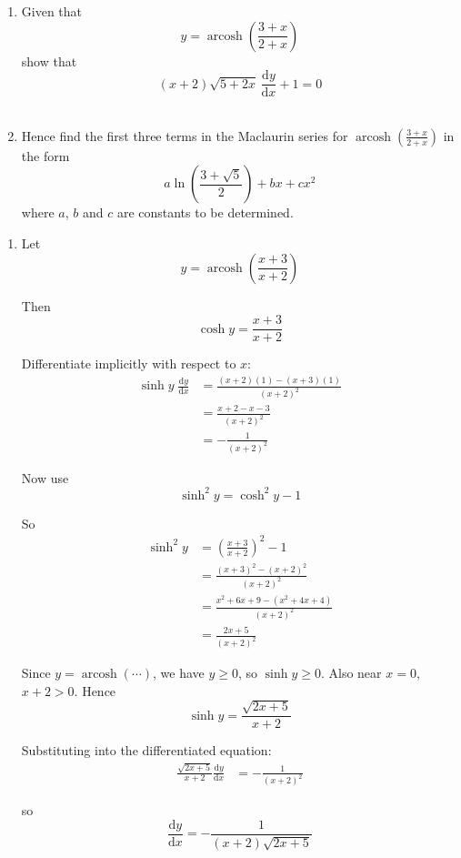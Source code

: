 \documentclass[leqno]{article}
\begin{document}
\begin{enumerate}[
  label=\textbf{\arabic*.},
  leftmargin=*,
  topsep=0pt,
  partopsep=0pt,
  parsep=0pt
]
\begin{enumerate}[label=\textbf{(\alph*)}]
  \item Given that \[y=\operatorname{arcosh}\left(\frac{3+x}{2+x}\right)\] show that \[(x+2)\sqrt{5+2x}\,\frac{\mathrm{d}y}{\mathrm{d}x}+1=0\]  \\
  \item Hence find the first three terms in the Maclaurin series for $\operatorname{arcosh}\left(\frac{3+x}{2+x}\right)$ in the form
  \[
  a\ln\left(\frac{3+\sqrt{5}}{2}\right)+bx+cx^2
  \]
  where $a$, $b$ and $c$ are constants to be determined.  \\
\end{enumerate}

\vspace*{10pt}

\begin{djsSolution}
\begin{enumerate}[label=\textbf{(\alph*)}]
  \item Let
\[
y=\operatorname{arcosh}\left(\frac{x+3}{x+2}\right)
\]

Then
\[
\cosh y=\frac{x+3}{x+2}
\]

Differentiate implicitly with respect to \(x\):
\begin{align*}
\sinh y\;\frac{\mathrm{d}y}{\mathrm{d}x}
&=\frac{(x+2)(1)-(x+3)(1)}{(x+2)^2} \\
&=\frac{x+2-x-3}{(x+2)^2} \\
&=-\frac{1}{(x+2)^2}
\end{align*}

Now use
\[
\sinh^2 y=\cosh^2 y-1
\]

So
\begin{align*}
\sinh^2 y
&=\left(\frac{x+3}{x+2}\right)^2-1 \\
&=\frac{(x+3)^2-(x+2)^2}{(x+2)^2} \\
&=\frac{x^2+6x+9-(x^2+4x+4)}{(x+2)^2} \\
&=\frac{2x+5}{(x+2)^2}
\end{align*}

Since \(y=\operatorname{arcosh}(\cdots)\), we have \(y\ge 0\), so \(\sinh y\ge 0\). Also near \(x=0\), \(x+2>0\). Hence
\[
\sinh y=\frac{\sqrt{2x+5}}{x+2}
\]

Substituting into the differentiated equation:
\begin{align*}
\frac{\sqrt{2x+5}}{x+2}\frac{\mathrm{d}y}{\mathrm{d}x}
&=-\frac{1}{(x+2)^2}
\end{align*}

so
\[
\frac{\mathrm{d}y}{\mathrm{d}x}=-\frac{1}{(x+2)\sqrt{2x+5}}
\]


\end{enumerate}
\end{djsSolution}
\end{enumerate}
\end{document}
